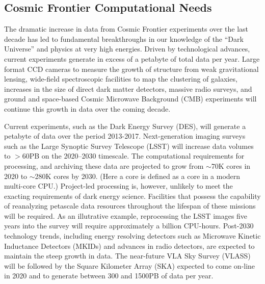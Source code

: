 \subsection{Cosmic Frontier Computational Needs}
The dramatic increase in data from Cosmic Frontier experiments over
the last decade has led to fundamental breakthroughs in our knowledge
of the ``Dark Universe'' and physics at very high energies. Driven by
technological advances, current experiments generate in excess of a
petabyte of total data per year. Large format CCD cameras to measure
the growth of structure from weak gravitational lensing, wide-field
spectroscopic facilities to map the clustering of galaxies, increases
in the size of direct dark matter detectors, massive radio surveys,
and ground and space-based Cosmic Microwave Background (CMB)
experiments will continue this growth in data over the coming decade.

Current experiments, such as the Dark Energy Survey (DES), will
generate a petabyte of data over the period 2013-2017. Next-generation
imaging surveys such as the Large Synoptic Survey Telescope (LSST)
will increase data volumes to $> 60$PB on the 2020--2030
timescale. The computational requirements for processing, and
archiving these data are projected to grow from $\sim$70K cores in
2020 to $\sim$280K cores by 2030. (Here a core is defined as a core in
a modern multi-core CPU.) Project-led processing is, however, unlikely
to meet the exacting requirements of dark energy science. Facilities
that possess the capability of reanalyzing petascale data resources
throughout the lifespan of these missions will be required. As an
illutrative example, reprocessing the LSST images five years into the
survey will require approximately a billion CPU-hours. Post-2030
technology trends, including energy resolving detectors such as
Microwave Kinetic Inductance Detectors (MKIDs) and advances in radio
detectors, are expected to maintain the steep growth in data. The
near-future VLA Sky Survey (VLASS) will be followed by the Square
Kilometer Array (SKA) expected to come on-line in 2020 and to generate
between 300 and 1500PB of data per year.

